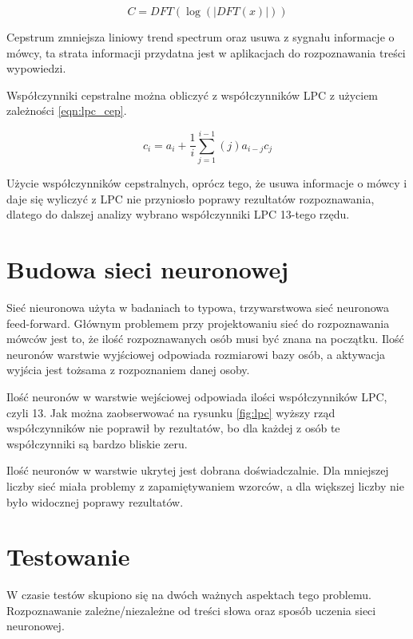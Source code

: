 \documentclass[journal]{IEEEtran}
\begin{document}
\begin{equation}\label{eqn:cepstrum}
    C = DFT( \log ( | DFT (x) | ) )
\end{equation}

Cepstrum zmniejsza liniowy trend spectrum oraz usuwa z sygnału informacje o
mówcy, ta strata informacji przydatna jest w aplikacjach do rozpoznawania
treści wypowiedzi.

Współczynniki cepstralne można obliczyć z współczynników LPC z użyciem
zależności \ref{eqn:lpc_cep}.

\begin{equation}\label{eqn:lpc_cep}
    c_i = a_i + \frac{1}{i} \sum_{j=1}^{i-1} (j)a_{i-j} c_j
\end{equation}

Użycie współczynników cepstralnych, oprócz tego, że usuwa informacje o mówcy i
daje się wyliczyć z LPC nie przyniosło poprawy rezultatów rozpoznawania,
dlatego do dalszej analizy wybrano współczynniki LPC 13-tego rzędu.


\section{Budowa sieci neuronowej}

Sieć nieuronowa użyta w badaniach to typowa, trzywarstwowa sieć neuronowa
feed-forward. Głównym problemem przy projektowaniu sieć do rozpoznawania mówców
jest to, że ilość rozpoznawanych osób musi być znana na początku. Ilość
neuronów warstwie wyjściowej odpowiada rozmiarowi bazy osób, a aktywacja
wyjścia jest tożsama z rozpoznaniem danej osoby.

Ilość neuronów w warstwie wejściowej odpowiada ilości współczynników LPC, czyli
13. Jak można zaobserwować na rysunku \ref{fig:lpc} wyższy rząd współczynników
nie poprawił by rezultatów, bo dla każdej z osób te współczynniki są bardzo
bliskie zeru.

Ilość neuronów w warstwie ukrytej jest dobrana doświadczalnie. Dla mniejszej
liczby sieć miała problemy z zapamiętywaniem wzorców, a dla większej liczby nie
było widocznej poprawy rezultatów.

\section{Testowanie}

W czasie testów skupiono się na dwóch ważnych aspektach tego problemu.
Rozpoznawanie zależne/niezależne od treści słowa oraz sposób uczenia sieci
neuronowej.
\end{document}
